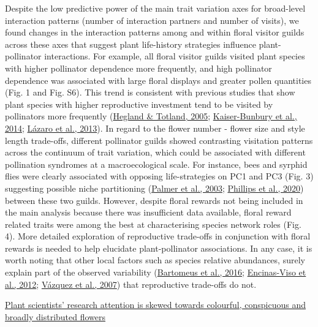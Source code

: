 \documentclass[
  12pt,
  a4paper,
]{article}
\begin{document}
Despite the low predictive power of the main trait variation axes for broad-level interaction patterns (number of interaction partners and number of visits), we found changes in the interaction patterns among and within floral visitor guilds across these axes that suggest plant life-history strategies influence plant-pollinator interactions. For example, all floral visitor guilds visited plant species with higher pollinator dependence more frequently, and high pollinator dependence was associated with large floral displays and greater pollen quantities (Fig. 1 and Fig. S6). This trend is consistent with previous studies that show plant species with higher reproductive investment tend to be visited by pollinators more frequently (\protect\hyperlink{ref-hegland2005}{Hegland \& Totland, 2005}; \protect\hyperlink{ref-kaiser2014}{Kaiser-Bunbury et al., 2014}; \protect\hyperlink{ref-lazaro2013}{Lázaro et al., 2013}). In regard to the flower number - flower size and style length trade-offs, different pollinator guilds showed contrasting visitation patterns across the continuum of trait variation, which could be associated with different pollination syndromes at a macroecological scale. For instance, bees and syrphid flies were clearly associated with opposing life-strategies on PC1 and PC3 (Fig. 3) suggesting possible niche partitioning (\protect\hyperlink{ref-palmer2003}{Palmer et al., 2003}; \protect\hyperlink{ref-phillips2020}{Phillips et al., 2020}) between these two guilds. However, despite floral rewards not being included in the main analysis because there was insufficient data available, floral reward related traits were among the best at characterising species network roles (Fig. 4). More detailed exploration of reproductive trade-offs in conjunction with floral rewards is needed to help elucidate plant-pollinator associations. In any case, it is worth noting that other local factors such as species relative abundances, surely explain part of the observed variability (\protect\hyperlink{ref-bartomeus2016}{Bartomeus et al., 2016}; \protect\hyperlink{ref-encinas2012}{Encinas-Viso et al., 2012}; \protect\hyperlink{ref-vazquez2007}{Vázquez et al., 2007}) that reproductive trade-offs do not.

\href{May\%20be\%20interesting\%20to\%20comment\%20on}{Plant scientists' research attention is skewed towards colourful, conspicuous and broadly distributed flowers}
\end{document}
